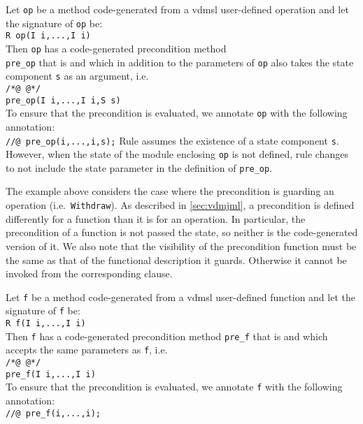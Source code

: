 {
  Let \texttt{op} be a method code-generated from a \ac{vdmsl} user-defined operation and let the signature of \texttt{op} be:\\
   \texttt{R op(I i,...,I i)}\\
  Then \texttt{op} has a code-generated precondition method\\
  \texttt{pre\_op} that is  and which in addition to the
  pa\-ra\-met\-ers of \texttt{op} also takes the state component \texttt{s} as an argument, i.e.\ \\
  \texttt{/*@  @*/}  \texttt{ \\
    pre\_op(I i,...,I i,S s)}\\
  To ensure that the precondition is evaluated, we annotate \texttt{op} with the following  annotation:\\
  \texttt{//@  pre\_op(i,...,i,s);}}
%
%
Rule  assumes the existence of a state component
\texttt{s}. However, when the state of the module enclosing
\texttt{op} is not defined, rule  changes to not include
the state parameter in the definition of \texttt{pre\_op}.

The example above considers the case where the precondition is
guarding an operation (i.e.\ \texttt{Withdraw}). As described in
\autoref{sec:vdmjml}, a precondition is defined differently for a
function than it is for an operation. In particular, the precondition
of a function is not passed the state, so neither is the
code-generated version of it. We also note that the visibility of the
precondition function must be the same as that of the functional
description it guards. Otherwise it cannot be invoked from the
corresponding  clause.

 {
  Let \texttt{f} be a method code-generated from a \ac{vdmsl} user-defined function and let the signature of \texttt{f} be:\\
   \texttt{R f(I i,...,I i)}\\
  Then \texttt{f} has a code-generated precondition method
  \texttt{pre\_f} that is  and which accepts the same parameters as \texttt{f}, i.e.\ \\
  \texttt{/*@  @*/}  \texttt{ \\
    pre\_f(I i,...,I i)}\\
  To ensure that the precondition is evaluated, we annotate \texttt{f} with the following  annotation:\\
  \texttt{//@  pre\_f(i,...,i);}}
  
